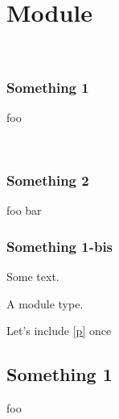 \section{Module }\label{Include_sections}%
\label{Include_sections--module-type-Something}\label{Include_sections-module-type-Something}\begin{ocamlindent}\label{Include_sections-module-type-Something--val-something}\\
\subsubsection{Something 1\label{Include_sections-module-type-Something--something-1}}%
foo

\label{Include_sections-module-type-Something--val-foo}\\
\subsubsection{Something 2\label{Include_sections-module-type-Something--something-2}}%
\label{Include_sections-module-type-Something--val-bar}\begin{ocamlindent}foo bar\end{ocamlindent}%
\medbreak
\subsubsection{Something 1-bis\label{Include_sections-module-type-Something--something-1-bis}}%
Some text.

\end{ocamlindent}%
\begin{ocamlindent}A module type.\end{ocamlindent}%
\medbreak
Let's include \hyperref[Include_sections-module-type-Something]{[p\pageref*{Include_sections-module-type-Something}]} once

 \hyperref[Include_sections-module-type-Something]{}\subsection{Something 1\label{Include_sections--something-1_2}}%
foo

